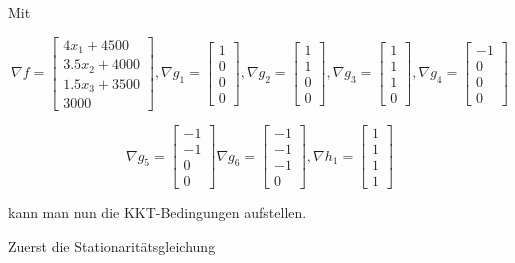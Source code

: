 \documentclass[a4paper, 12pt]{report}
\begin{document}
Mit

$$ \nabla f = \begin{bmatrix}4x_1 + 4500\\3.5x_2 + 4000\\1.5x_3 + 3500\\3000\end{bmatrix}, \nabla g_1 = \begin{bmatrix}1\\0\\0\\0\end{bmatrix}, \nabla g_2 = \begin{bmatrix}1\\1\\0\\0\end{bmatrix}, \nabla g_3 = \begin{bmatrix} 1\\1\\1\\0 \end{bmatrix}, \nabla g_4 = \begin{bmatrix}-1\\0\\0\\0\end{bmatrix} $$

$$ \nabla g_5 = \begin{bmatrix} -1\\-1\\0\\0 \end{bmatrix} \nabla g_6 = \begin{bmatrix}-1\\-1\\-1\\0\end{bmatrix}, \nabla h_1 = \begin{bmatrix}1\\1\\1\\1\end{bmatrix} $$

kann man nun die KKT-Bedingungen aufstellen.\par
Zuerst die Stationaritätsgleichung
\end{document}
